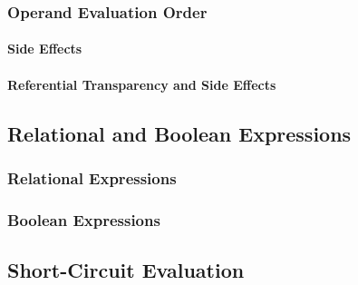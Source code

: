 \subsubsection{Operand Evaluation Order}\label{subsubsec:Operand_Evaluation_Order}
\paragraph{Side Effects}\label{par:Operand_Evaluation-Side_Effects}
\paragraph{Referential Transparency and Side Effects}\label{par:Operand_Evaluation-Referential_Transparency_Side_Effects}

\subsection{Relational and Boolean Expressions}\label{subsec:Relational_Boolean_Expressions}
\subsubsection{Relational Expressions}\label{subsubsec:Relational_Expressions}
\subsubsection{Boolean Expressions}\label{subsubsec:Boolean_Expressions}

\subsection{Short-Circuit Evaluation}\label{subsec:Short_Circuit_Evaluation}

